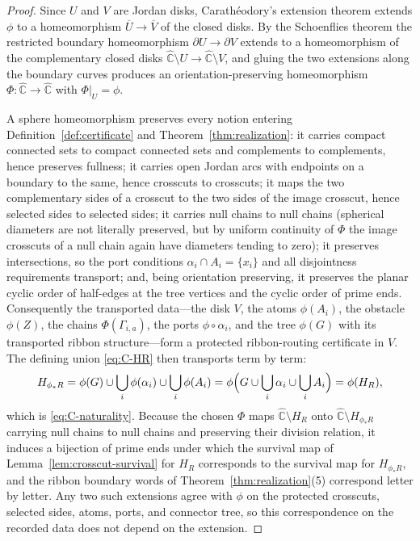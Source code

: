 \documentclass[11pt,reqno]{amsart}
\theoremstyle{definition}
\theoremstyle{remark}
\newcommand{\Chat}{\widehat{\mathbb C}}
\begin{document}
\begin{proof}
Since $U$ and $V$ are Jordan disks, Carath\'eodory's extension theorem
\cite{Pom92} extends $\phi$ to a homeomorphism
$\overline U\to\overline V$ of the closed disks.  By the Schoenflies
theorem the restricted boundary homeomorphism
$\partial U\to\partial V$ extends to a homeomorphism of the complementary
closed disks $\Chat\setminus U\to\Chat\setminus V$, and gluing the two
extensions along the boundary curves produces an orientation-preserving
homeomorphism $\Phi\colon\Chat\to\Chat$ with $\Phi|_U=\phi$.

A sphere homeomorphism preserves every notion entering
Definition~\ref{def:certificate} and Theorem~\ref{thm:realization}: it
carries compact connected sets to compact connected sets and complements
to complements, hence preserves fullness; it carries open Jordan arcs
with endpoints on a boundary to the same, hence crosscuts to crosscuts;
it maps the two complementary sides of a crosscut to the two sides of the
image crosscut, hence selected sides to selected sides; it carries null
chains to null chains (spherical diameters are not literally preserved,
but by uniform continuity of $\Phi$ the image crosscuts of a null chain
again have diameters tending to zero); it preserves intersections, so the
port conditions $\alpha_i\cap A_i=\{x_i\}$ and all disjointness
requirements transport; and, being orientation preserving, it preserves
the planar cyclic order of half-edges at the tree vertices and the cyclic
order of prime ends.  Consequently the transported data---the disk $V$,
the atoms $\phi(A_i)$, the obstacle $\phi(Z)$, the chains
$\Phi(\Gamma_{i,a})$, the ports $\phi\circ\alpha_i$, and the tree
$\phi(G)$ with its transported ribbon structure---form a protected
ribbon-routing certificate in $V$.  The defining union \eqref{eq:C-HR}
then transports term by term:
\[
H_{\phi_*R}
=\phi(G)\cup\bigcup_i\phi(\alpha_i)\cup\bigcup_i\phi(A_i)
=\phi\Bigl(G\cup\bigcup_i\alpha_i\cup\bigcup_iA_i\Bigr)
=\phi(H_R),
\]
which is \eqref{eq:C-naturality}.  Because the chosen $\Phi$ maps
$\Chat\setminus H_R$ onto $\Chat\setminus H_{\phi_*R}$ carrying null
chains to null chains and preserving their division relation, it induces
a bijection of prime ends under which the survival map of
Lemma~\ref{lem:crosscut-survival} for $H_R$ corresponds to the survival
map for $H_{\phi_*R}$, and the ribbon boundary words of
Theorem~\ref{thm:realization}(5) correspond letter by letter.  Any two
such extensions agree with $\phi$ on the protected crosscuts, selected
sides, atoms, ports, and connector tree, so this correspondence on the
recorded data does not depend on the extension.
\end{proof}
\end{document}
